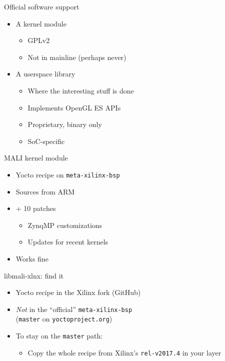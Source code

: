 \documentclass[xetex,table]{beamer}
\begin{document}
\begin{frame}{Official software support}
  \begin{itemize}
  \item A kernel module
    \begin{itemize}
    \item GPLv2
    \item Not in mainline (perhaps never)
    \end{itemize}
  \item A userspace library
    \begin{itemize}
    \item Where the interesting stuff is done
    \item Implements OpenGL ES APIs
    \item Proprietary, binary only
    \item SoC-specific
    \end{itemize}
  \end{itemize}
\end{frame}

\begin{frame}{MALI kernel module}
  \begin{itemize}
  \item Yocto recipe on {\tt meta-xilinx-bsp}
  \item Sources from ARM
  \item + 10 patches
    \begin{itemize}
    \item ZynqMP customizations
    \item Updates for recent kernels
    \end{itemize}
  \item Works fine
  \end{itemize}
\end{frame}

\begin{frame}{libmali-xlnx: find it}
  \begin{itemize}
  \item Yocto recipe in the Xilinx fork (GitHub)
  \item {\em Not} in the ``official'' {\tt meta-xilinx-bsp}\\
    ({\tt master} on {\tt yoctoproject.org})
  \item To stay on the {\tt master} path:
    \begin{itemize}
    \item Copy the whole recipe from Xilinx's {\tt rel-v2017.4} in your layer
     \end{itemize}
   \end{itemize}
\end{frame}
\end{document}
